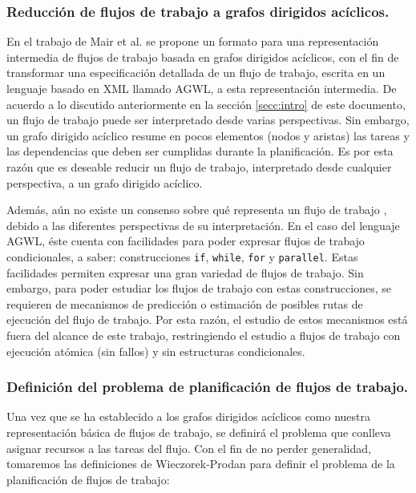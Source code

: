 \subsubsection{Reducción de flujos de trabajo a grafos dirigidos acíclicos.}

En el trabajo de Mair et al. \cite{mair2007workflow} se propone un formato para una representación intermedia de flujos de trabajo basada en grafos dirigidos acíclicos, con el fin de transformar una especificación detallada de un flujo de trabajo, escrita en un lenguaje basado en XML llamado AGWL, a esta representación intermedia. De acuerdo a lo discutido anteriormente en la sección \ref{secc:intro} de este documento, un flujo de trabajo puede ser interpretado desde varias perspectivas. Sin embargo, un grafo dirigido acíclico resume en pocos elementos (nodos y aristas) las tareas y las dependencias que deben ser cumplidas durante la planificación. Es por esta razón que es deseable reducir un flujo de trabajo, interpretado desde cualquier perspectiva, a un grafo dirigido acíclico.

Además, aún no existe un consenso sobre qué representa un flujo de trabajo \cite{van2003workflow}, debido a las diferentes perspectivas de su interpretación. En el caso del lenguaje AGWL, éste cuenta con facilidades para poder expresar flujos de trabajo condicionales, a saber: construcciones \texttt{if}, \texttt{while}, \texttt{for} y \texttt{parallel}. Estas facilidades permiten expresar una gran variedad de flujos de trabajo. Sin embargo, para poder estudiar los flujos de trabajo con estas construcciones, se requieren de mecanismos de predicción o estimación de posibles rutas de ejecución del flujo de trabajo. Por esta razón, el estudio de estos mecanismos está fuera del alcance de este trabajo, restringiendo el estudio a flujos de trabajo con ejecución atómica (sin fallos) y sin estructuras condicionales.

\subsubsection{Definición del problema de planificación de flujos de trabajo.}
Una vez que se ha establecido a los grafos dirigidos acíclicos como nuestra representación básica de flujos de trabajo, se definirá el problema que conlleva asignar recursos a las tareas del flujo. Con el fin de no perder generalidad, tomaremos las definiciones de Wieczorek-Prodan \cite{wieczorek2008taxonomies} para definir el problema de la planificación de flujos de trabajo:

